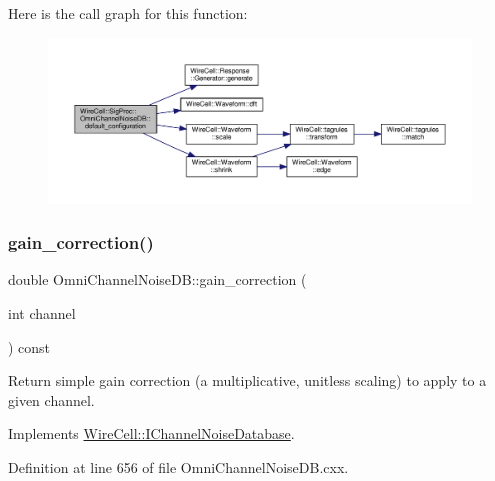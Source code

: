 Here is the call graph for this function\+:
\nopagebreak
\begin{figure}[H]
\begin{center}
\leavevmode
\includegraphics[width=350pt]{class_wire_cell_1_1_sig_proc_1_1_omni_channel_noise_d_b_af33aa262d6af04f4252abef453156799_cgraph}
\end{center}
\end{figure}
\mbox{\label{class_wire_cell_1_1_sig_proc_1_1_omni_channel_noise_d_b_a60802eabcf081d7b82ed7b270dcefe00}} 
\subsubsection{\texorpdfstring{gain\+\_\+correction()}{gain\_correction()}}
{\footnotesize\ttfamily double Omni\+Channel\+Noise\+D\+B\+::gain\+\_\+correction (\begin{DoxyParamCaption}\item[{int}]{channel }\end{DoxyParamCaption}) const\hspace{0.3cm}{\ttfamily [virtual]}}

Return simple gain correction (a multiplicative, unitless scaling) to apply to a given channel. 

Implements \hyperlink{class_wire_cell_1_1_i_channel_noise_database_ad2cdf46aea4ac11f8b7d097bd19c2e80}{Wire\+Cell\+::\+I\+Channel\+Noise\+Database}.



Definition at line 656 of file Omni\+Channel\+Noise\+D\+B.\+cxx.

